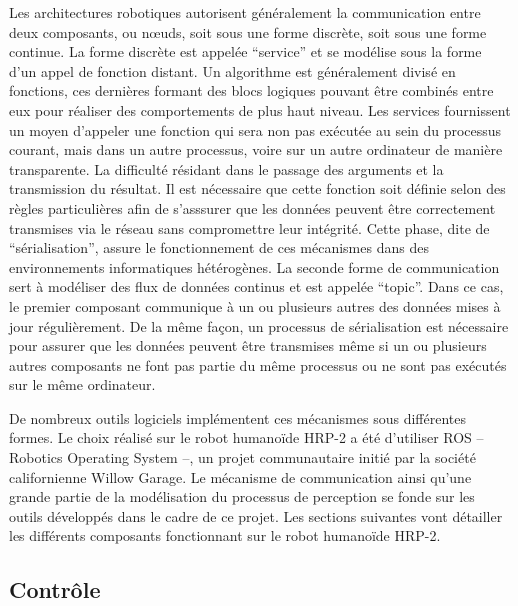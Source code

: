 Les architectures robotiques autorisent généralement la communication
entre deux composants, ou n\oe uds, soit sous une forme discrète, soit
sous une forme continue. La forme discrète est appelée
``service'' et se modélise sous la forme d'un appel de
fonction distant. Un algorithme est généralement divisé en fonctions,
ces dernières formant des blocs logiques pouvant être combinés entre
eux pour réaliser des comportements de plus haut niveau. Les services
fournissent un moyen d'appeler une fonction qui sera non pas exécutée
au sein du processus courant, mais dans un autre processus, voire sur
un autre ordinateur de manière transparente. La difficulté résidant
dans le passage des arguments et la transmission du résultat. Il est
nécessaire que cette fonction soit définie selon des règles
particulières afin de s'asssurer que les données peuvent être
correctement transmises via le réseau sans compromettre leur
intégrité. Cette phase, dite de
``sérialisation'', assure le fonctionnement de
ces mécanismes dans des environnements informatiques hétérogènes. La
seconde forme de communication sert à modéliser des flux de données
continus et est appelée ``topic''. Dans ce cas, le
premier composant communique à un ou plusieurs autres des données
mises à jour régulièrement. De la même façon, un processus de
sérialisation est nécessaire pour assurer que les données peuvent être
transmises même si un ou plusieurs autres composants ne font pas
partie du même processus ou ne sont pas exécutés sur le même
ordinateur.


De nombreux outils logiciels implémentent ces mécanismes sous
différentes formes. Le choix réalisé sur le robot humanoïde HRP-2 a
été d'utiliser ROS -- Robotics Operating System --, un
projet communautaire initié par la société californienne Willow
Garage. Le mécanisme de communication ainsi
qu'une grande partie de la modélisation du processus de perception se
fonde sur les outils développés dans le cadre de ce projet. Les
sections suivantes vont détailler les différents composants
fonctionnant sur le robot humanoïde HRP-2.



\subsection{Contrôle}


